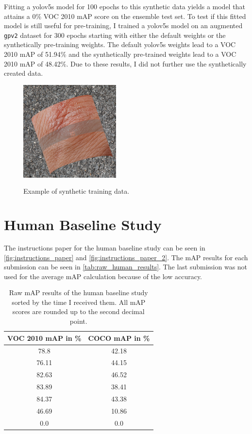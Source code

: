 \documentclass[10pt]{book}
\newcommand{\figureref}[1]{\autoref{#1}}
\begin{document}
Fitting a yolov5s model for 100 epochs to this synthetic data yields a model that attains a 0\% VOC 2010 \ac{mAP} score on the ensemble test set. To test if this fitted model is still useful for pre-training, I trained a yolov5s model on an augmented \texttt{gpv2} dataset for 300 epochs starting with either the default weights or the synthetically pre-training weights. The default yolov5s weights lead to a VOC 2010 \ac{mAP} of 51.94\% and the synthetically pre-trained weights lead to a VOC 2010 \ac{mAP} of 48.42\%. Due to these results, I did not further use the synthetically created data.

\begin{figure}
  \caption{Example of synthetic training data.}
  \includegraphics[width=0.45\textwidth]{image/synth_data_example}
  \label{fig:synth_data_example}
\end{figure}

\section{Human Baseline Study}
\label{sec:instructions_paper}

The instructions paper for the human baseline study can be seen in \figureref{fig:instructions_paper} and \figureref{fig:instructions_paper_2}. The \ac{mAP} results for each submission can be seen in \autoref{tab:raw_human_results}. The last submission was not used for the average \ac{mAP} calculation because of the low accuracy.

\begin{table}
  \begin{tabular}{ c c }
   VOC 2010 \ac{mAP} in \% & COCO \ac{mAP} in \% \\ 
   \hline
   78.8 & 42.18 \\
   76.11 & 44.15 \\
   82.63 & 46.52 \\
   83.89 & 38.41 \\
   84.37 & 43.38 \\
   46.69 & 10.86 \\
   0.0 & 0.0 \\
   \hline
  \end{tabular}
  \caption{\label{tab:raw_human_results}Raw \ac{mAP} results of the human baseline study sorted by the time I received them. All \ac{mAP} scores are rounded up to the second decimal point.}
\end{table}
\end{document}
